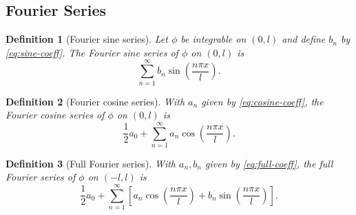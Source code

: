 \documentclass{article}
\newtheorem{definition}{Definition}
\begin{document}
\subsection{Fourier Series}
\begin{definition}[Fourier sine series]
    Let $\phi$ be integrable on $(0,l)$ and define $b_n$ by \eqref{eq:sine-coeff}. The Fourier sine series of $\phi$ on $(0,l)$ is
    \begin{equation}
        \sum_{n=1}^\infty b_n\sin\left(\frac{n\pi x}{l}\right).
    \end{equation}
\end{definition}
\begin{definition}[Fourier cosine series]
    With $a_n$ given by \eqref{eq:cosine-coeff}, the Fourier cosine series of $\phi$ on $(0,l)$ is
    \begin{equation}
        \frac{1}{2}a_0 + \sum_{n=1}^\infty a_n\cos\left(\frac{n\pi x}{l}\right).
    \end{equation}
\end{definition}
\begin{definition}[Full Fourier series]
    With $a_n,b_n$ given by \eqref{eq:full-coeff}, the full Fourier series of $\phi$ on $(-l,l)$ is
    \begin{equation}
        \frac{1}{2}a_0 + \sum_{n=1}^\infty \left[a_n\cos\left(\frac{n\pi x}{l}\right) + b_n\sin\left(\frac{n\pi x}{l}\right)\right].
    \end{equation}
\end{definition}
\end{document}
